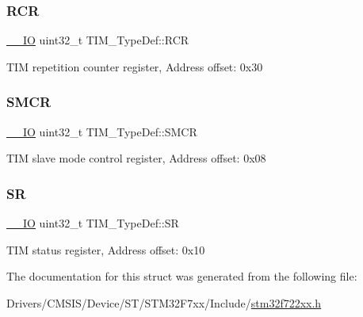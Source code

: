 \subsubsection{\texorpdfstring{RCR}{RCR}}
{\footnotesize\ttfamily \mbox{\hyperlink{core__sc300_8h_aec43007d9998a0a0e01faede4133d6be}{\+\_\+\+\_\+\+IO}} uint32\+\_\+t T\+I\+M\+\_\+\+Type\+Def\+::\+R\+CR}

T\+IM repetition counter register, Address offset\+: 0x30 \mbox{\label{struct_t_i_m___type_def_a67d30593bcb68b98186ebe5bc8dc34b1}} 
\subsubsection{\texorpdfstring{SMCR}{SMCR}}
{\footnotesize\ttfamily \mbox{\hyperlink{core__sc300_8h_aec43007d9998a0a0e01faede4133d6be}{\+\_\+\+\_\+\+IO}} uint32\+\_\+t T\+I\+M\+\_\+\+Type\+Def\+::\+S\+M\+CR}

T\+IM slave mode control register, Address offset\+: 0x08 \mbox{\label{struct_t_i_m___type_def_acedfc978c879835c05ef1788ad26b2ff}} 
\subsubsection{\texorpdfstring{SR}{SR}}
{\footnotesize\ttfamily \mbox{\hyperlink{core__sc300_8h_aec43007d9998a0a0e01faede4133d6be}{\+\_\+\+\_\+\+IO}} uint32\+\_\+t T\+I\+M\+\_\+\+Type\+Def\+::\+SR}

T\+IM status register, Address offset\+: 0x10 

The documentation for this struct was generated from the following file\+:\begin{DoxyCompactItemize}
\item 
Drivers/\+C\+M\+S\+I\+S/\+Device/\+S\+T/\+S\+T\+M32\+F7xx/\+Include/\mbox{\hyperlink{stm32f722xx_8h}{stm32f722xx.\+h}}\end{DoxyCompactItemize}

